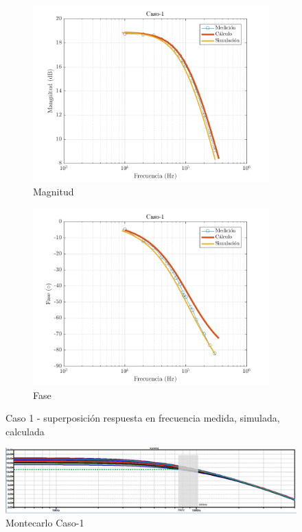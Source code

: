 \documentclass[../../main.tex]{subfiles}
\begin{document}
\begin{figure}[H]
\centering
\begin{subfigure}[http]{0.49\textwidth}
\includegraphics[width=\textwidth]{Caso-1_mag_n}
\caption{Magnitud}\label{fig=magnC1}
\end{subfigure}
\begin{subfigure}[http]{0.49\textwidth}
\includegraphics[width=\textwidth]{Caso-1_fase_n}
\caption{Fase}
\end{subfigure}
\caption{Caso 1 - superposición respuesta en  frecuencia medida, simulada, calculada}
\end{figure}

\begin{figure}[H]
\centering
\includegraphics[width=1\textwidth]{montecarlo_n_c1}
\caption{Montecarlo Caso-1} \label{fig=mcnC1}
\end{figure}
\end{document}
